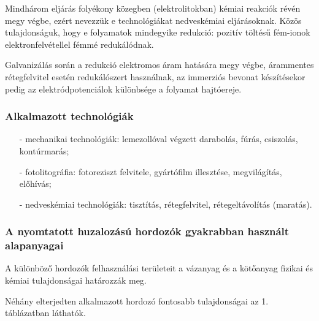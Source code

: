 \documentclass[../labor.tex]{subfiles}
\begin{document}
    Mindhárom eljárás folyékony közegben (elektrolitokban) kémiai reakciók révén megy végbe, ezért nevezzük e technológiákat nedveskémiai eljárásoknak. Közös tulajdonságuk, hogy e folyamatok mindegyike redukció: pozitív töltésű fém-ionok elektronfelvétellel fémmé redukálódnak.
    
    Galvanizálás során a redukció elektromos áram hatására megy végbe, árammentes rétegfelvitel esetén redukálószert használnak, az immerziós bevonat készítésekor pedig az elektródpotenciálok különbsége a folyamat hajtóereje.

    \subsubsection{Alkalmazott technológiák}
    \begin{itemize}
        \item[-] mechanikai technológiák: lemezollóval végzett darabolás, fúrás, csiszolás, kontúrmarás;
        \item[-] fotolitográfia: fotoreziszt felvitele, gyártófilm illesztése, megvilágítás, előhívás;
        \item[-] nedveskémiai technológiák: tisztítás, rétegfelvitel, rétegeltávolítás (maratás).
    \end{itemize}
        
        
        

    \subsubsection{A nyomtatott huzalozású hordozók gyakrabban használt alapanyagai} A különböző hordozók felhasználási területeit a vázanyag és a kötőanyag fizikai és kémiai tulajdonságai határozzák meg.
    
    Néhány elterjedten alkalmazott hordozó fontosabb tulajdonságai az 1. táblázatban láthatók.



\end{document}
